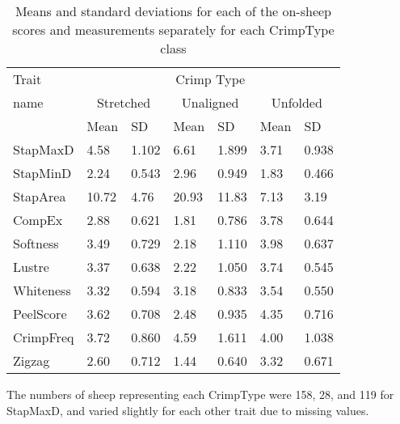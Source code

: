 %

\begin{table}[htp]
\centering
\caption{Means and standard deviations for each of the on-sheep scores and measurements separately for each CrimpType class}
\label{tab:means}
\vspace{0.1in}
\begin{tabular}{|p{0.6in}|p{0.5in}|p{0.5in}|p{0.5in}|p{0.5in}|p{0.5in}|p{0.5in}|}  \hline
  Trait  & \multicolumn{6}{c|}{Crimp Type}     \\ \cline{2-7}  
  name   & \multicolumn{2}{c|}{Stretched}   & \multicolumn{2}{c|}{Unaligned}  & \multicolumn{2}{c|}{Unfolded}  \\ \cline{2-7}
         & Mean & SD & Mean & SD & Mean & SD \\ \hline
 StapMaxD &  4.58  & 1.102 & 6.61  & 1.899 & 3.71 & 0.938 \\
 StapMinD &  2.24  & 0.543 & 2.96  & 0.949 & 1.83 & 0.466 \\
 StapArea &  10.72 & 4.76 & 20.93 & 11.83 & 7.13 & 3.19 \\
 CompEx   &  2.88  & 0.621 & 1.81  & 0.786 & 3.78 & 0.644 \\
 Softness &  3.49  & 0.729 & 2.18  & 1.110 & 3.98 & 0.637 \\
 Lustre   &  3.37  & 0.638 & 2.22  & 1.050 & 3.74 & 0.545 \\
 Whiteness & 3.32  & 0.594 & 3.18  & 0.833 & 3.54 & 0.550 \\
 PeelScore & 3.62  & 0.708 & 2.48  & 0.935 & 4.35 & 0.716 \\
 CrimpFreq & 3.72  & 0.860 & 4.59  & 1.611 & 4.00 & 1.038 \\
 Zigzag   &  2.60  & 0.712 & 1.44  & 0.640 & 3.32 & 0.671 \\ \hline
\end{tabular}
\begin{tablenotes}
\small
\item The numbers of sheep representing each CrimpType were 158, 28, and 119 for StapMaxD, and varied slightly for each other trait due to missing values.
\end{tablenotes}
\end{table}


%
